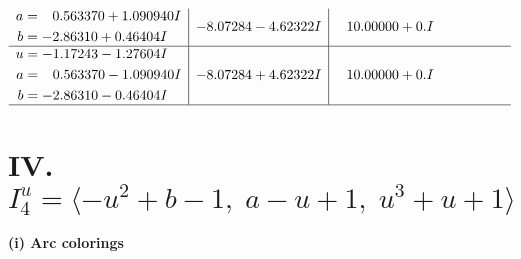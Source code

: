 \documentclass[1p]{elsarticle_modified}
\theoremstyle{definition}
\begin{document}
$$\begin{array}{c|c|c}
\begin{aligned}
a &= \phantom{-}0.563370 + 1.090940 I \\
b &= -2.86310 + 0.46404 I\end{aligned}
 & -8.07284 - 4.62322 I & \phantom{-}10.00000 + 0. I\phantom{ +0.000000I} \\ \hline\begin{aligned}
u &= -1.17243 - 1.27604 I \\
a &= \phantom{-}0.563370 - 1.090940 I \\
b &= -2.86310 - 0.46404 I\end{aligned}
 & -8.07284 + 4.62322 I & \phantom{-}10.00000 + 0. I\phantom{ +0.000000I}\\
 \hline 
 \end{array}$$\newpage\newpage\renewcommand{\arraystretch}{1}
\centering \section*{IV. $I^u_{4}= \langle - u^2+b-1,\;a- u+1,\;u^3+u+1 \rangle$}
\flushleft \textbf{(i) Arc colorings}\\
\end{document}
